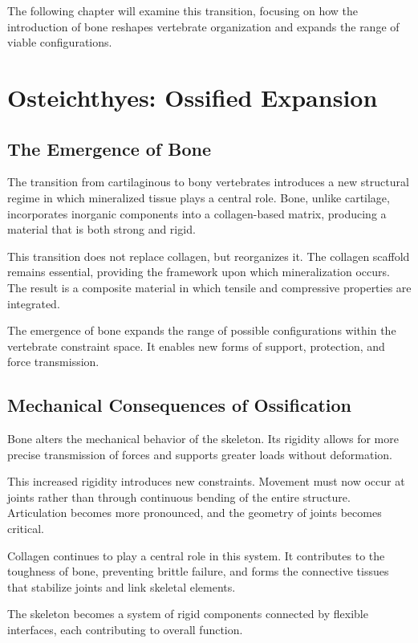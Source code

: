 \documentclass[11pt,oneside]{book}
\begin{document}
The following chapter will examine this transition, focusing on how the introduction of bone reshapes vertebrate organization and expands the range of viable configurations.

\chapter{Osteichthyes: Ossified Expansion}

\section{The Emergence of Bone}

The transition from cartilaginous to bony vertebrates introduces a new structural regime in which mineralized tissue plays a central role. Bone, unlike cartilage, incorporates inorganic components into a collagen-based matrix, producing a material that is both strong and rigid.

This transition does not replace collagen, but reorganizes it. The collagen scaffold remains essential, providing the framework upon which mineralization occurs. The result is a composite material in which tensile and compressive properties are integrated.

The emergence of bone expands the range of possible configurations within the vertebrate constraint space. It enables new forms of support, protection, and force transmission.

\section{Mechanical Consequences of Ossification}

Bone alters the mechanical behavior of the skeleton. Its rigidity allows for more precise transmission of forces and supports greater loads without deformation.

This increased rigidity introduces new constraints. Movement must now occur at joints rather than through continuous bending of the entire structure. Articulation becomes more pronounced, and the geometry of joints becomes critical.

Collagen continues to play a central role in this system. It contributes to the toughness of bone, preventing brittle failure, and forms the connective tissues that stabilize joints and link skeletal elements.

The skeleton becomes a system of rigid components connected by flexible interfaces, each contributing to overall function.
\end{document}
